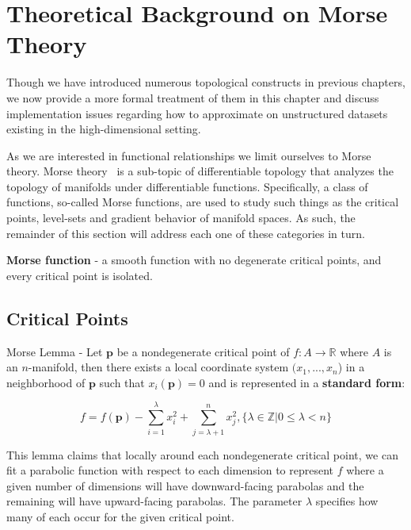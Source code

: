 
\chapter{Theoretical Background on Morse Theory}
\label{ch:theory}

Though we have introduced numerous topological constructs in previous chapters, we now provide a more formal treatment of them in this chapter and discuss implementation issues regarding how to approximate on unstructured datasets existing in the high-dimensional setting.

As we are interested in functional relationships we limit ourselves to Morse theory.
%
Morse theory~\cite{Matsumoto2002,Milnor1973,Morse1949} is a sub-topic of differentiable topology that analyzes the topology of manifolds under differentiable functions.
%
Specifically, a class of functions, so-called Morse functions, are used to study such things as the critical points, level-sets and gradient behavior of manifold spaces.
%
As such, the remainder of this section will address each one of these categories in turn.

\begin{defn}
  \textbf{Morse function} - a smooth function with no degenerate critical points, and every critical point is isolated.
\end{defn}

\section{Critical Points}

\begin{lem} Morse Lemma - Let $\mathbf{p}$ be a nondegenerate critical point of $f : A \rightarrow \mathbb{R}$ where $A$ is an $n$-manifold, then there exists a local coordinate system $(x_1,...,x_n$) in a neighborhood of $\mathbf{p}$ such that $x_i(\mathbf{p}) = 0$ and is represented in a \textbf{standard form}:

\begin{equation}
f = f(\mathbf{p}) - \sum_{i=1}^{\lambda}x_i^2 + \sum_{j=\lambda+1}^n x_j^2, \{\lambda \in \mathbb{Z} | 0 \leq \lambda < n\}
\end{equation}
\end{lem}

This lemma claims that locally around each nondegenerate critical point, we can fit a parabolic function with respect to each dimension to represent $f$ where a given number of dimensions will have downward-facing parabolas and the remaining will have upward-facing parabolas.
%
The parameter $\lambda$ specifies how many of each occur for the given critical point.

